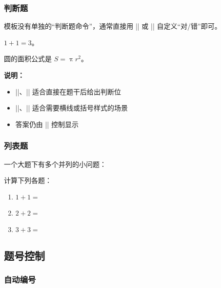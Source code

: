 \subsubsection{判断题}

模板没有单独的“判断题命令”，通常直接用 |\paren| 或 |\fillin| 自定义“对/错”即可。

\begin{latexcode}
  \begin{question}
    $1 + 1 = 3$。\paren[错]
  \end{question}

  \begin{question}
    圆的面积公式是 $S = \uppi r^2$。\fillin[对]
  \end{question}
\end{latexcode}

\textbf{说明：}
\begin{itemize}
  \item |\paren[对]|、|\paren[错]| 适合直接在题干后给出判断位
  \item |\fillin[对]|、|\fillin[错]| 适合需要横线或括号样式的场景
  \item 答案仍由 || 控制显示
\end{itemize}

\subsubsection{列表题}

一个大题下有多个并列的小问题：

\begin{latexcode}
  \begin{question}
    计算下列各题：
    \begin{enumerate}
      \item $1 + 1 = $ \fillin[2]
      \item $2 + 2 = $ \fillin[4]
      \item $3 + 3 = $ \fillin[6]
    \end{enumerate}
  \end{question}
\end{latexcode}


\subsection{题号控制}

\subsubsection{自动编号}

